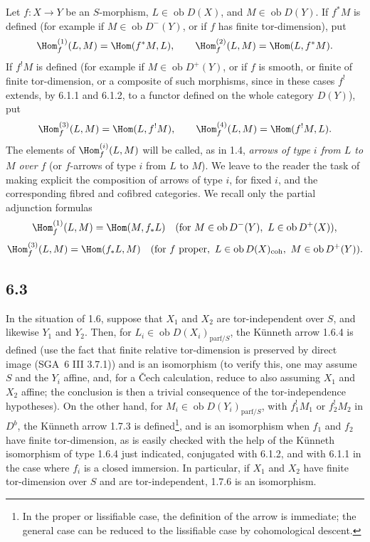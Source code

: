 Let $f:X\to Y$ be an $S$-morphism, $L\in\operatorname{ob}D(X)$, and $M\in\operatorname{ob}D(Y)$. If $f^*M$ is defined (for example if $M\in\operatorname{ob}D^-(Y)$, or if $f$ has finite tor-dimension), put
\[
\Hom_f^{(1)}(L,M)=\Hom(f^*M,L),\qquad
\Hom_f^{(2)}(L,M)=\Hom(L,f^*M).
\]
If $f^!M$ is defined (for example if $M\in\operatorname{ob}D^+(Y)$, or if $f$ is smooth, or finite of finite tor-dimension, or a composite of such morphisms, since in these cases $f^!$ extends, by 6.1.1 and 6.1.2, to a functor defined on the whole category $D(Y)$), put
\[
\Hom_f^{(3)}(L,M)=\Hom(L,f^!M),\qquad
\Hom_f^{(4)}(L,M)=\Hom(f^!M,L).
\]
The elements of $\Hom_f^{(i)}(L,M)$ will be called, as in 1.4, \emph{arrows of type $i$ from $L$ to $M$ over $f$} (or $f$-arrows of type $i$ from $L$ to $M$). We leave to the reader the task of making explicit the composition of arrows of type $i$, for fixed $i$, and the corresponding fibred and cofibred categories. We recall only the partial adjunction formulas
\[
\Hom_f^{(1)}(L,M)=\Hom(M,f_*L)\quad(\text{for }M\in\operatorname{ob}D^{-}(Y),\ L\in\operatorname{ob}D^+(X)),
\]
\[
\Hom_f^{(3)}(L,M)=\Hom(f_*L,M)\quad(\text{for }f\text{ proper},\ L\in\operatorname{ob}D(X)_{\mathrm{coh}},\ M\in\operatorname{ob}D^+(Y)).
\]

\subsection*{6.3}
In the situation of 1.6, suppose that $X_1$ and $X_2$ are tor-independent over $S$, and likewise $Y_1$ and $Y_2$. Then, for $L_i\in\operatorname{ob}D(X_i)_{\mathrm{parf}/S}$, the Künneth arrow 1.6.4 is defined (use the fact that finite relative tor-dimension is preserved by direct image (SGA~6 III 3.7.1)) and is an isomorphism (to verify this, one may assume $S$ and the $Y_i$ affine, and, for a Čech calculation, reduce to also assuming $X_1$ and $X_2$ affine; the conclusion is then a trivial consequence of the tor-independence hypotheses). On the other hand, for $M_i\in\operatorname{ob}D(Y_i)_{\mathrm{parf}/S}$, with $f_1^!M_1$ or $f_2^!M_2$ in $D^b$, the Künneth arrow 1.7.3 is defined\footnote{In the proper or lissifiable case, the definition of the arrow is immediate; the general case can be reduced to the lissifiable case by cohomological descent.}, and is an isomorphism when $f_1$ and $f_2$ have finite tor-dimension, as is easily checked with the help of the Künneth isomorphism of type 1.6.4 just indicated, conjugated with 6.1.2, and with 6.1.1 in the case where $f_i$ is a closed immersion. In particular, if $X_1$ and $X_2$ have finite tor-dimension over $S$ and are tor-independent, 1.7.6 is an isomorphism.

